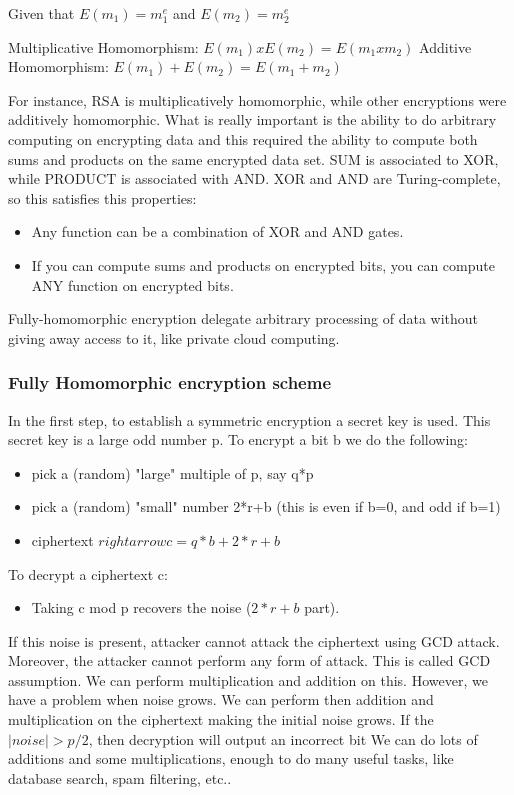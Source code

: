 Given that $E(m_1) = m_1^e$ and $E(m_2) = m_2^e$ 

Multiplicative Homomorphism:  $E(m_1) x E(m_2) = E(m_1 x m_2)$
Additive Homomorphism: $E(m_1) + E(m_2) = E(m_1 + m_2)$

For instance, RSA is multiplicatively homomorphic, while other encryptions were additively homomorphic. 
What is really important is the ability to do arbitrary computing on encrypting data and this required the ability to compute both sums and products on the same encrypted data set. 
SUM is associated to XOR, while PRODUCT is associated with AND. \newline
XOR and AND are Turing-complete, so this satisfies this properties: 

\begin{itemize}
    \item Any function can be a combination of XOR and AND gates.
    \item If you can compute sums and products on encrypted bits, you can compute ANY function on encrypted bits. 
\end{itemize} 

Fully-homomorphic encryption delegate arbitrary processing of data without giving away access to it, like private cloud computing. 

\subsubsection{Fully Homomorphic encryption scheme}

In the first step, to establish a symmetric encryption a secret key is used. This secret key is a large odd number p.\newline
To encrypt a bit b we do the following:
\begin{itemize}
    \item pick a (random) "large" multiple of p, say q*p
    \item pick a (random) "small" number 2*r+b (this is even if b=0, and odd if b=1)
    \item ciphertext $rightarrow c = q*b + 2*r+b$
\end{itemize}
To decrypt a ciphertext c: 
\begin{itemize}
    \item Taking c mod p recovers the noise ($2*r+b$ part).
\end{itemize}

If this noise is present, attacker cannot attack the ciphertext using GCD attack. Moreover, the attacker cannot perform any form of attack. This is called GCD assumption. We can perform multiplication and addition on this. However, we have a problem when noise grows.
We can perform then addition and multiplication on the ciphertext making the initial noise grows. If the $|noise| > p/2$, then decryption will output an incorrect bit
We can do lots of additions and some multiplications, enough to do many useful tasks, like database search, spam filtering, etc..

